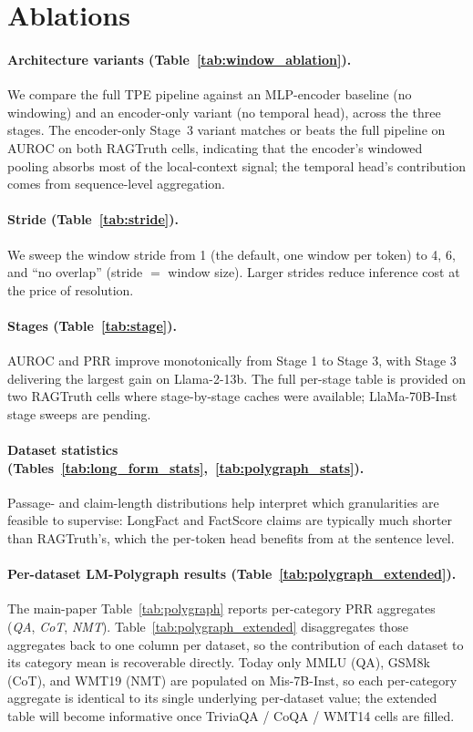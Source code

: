 \section{Ablations}
\label{sec:ablations}

\paragraph{Architecture variants (Table~\ref{tab:window_ablation}).}
We compare the full TPE pipeline against an MLP-encoder baseline
(no windowing) and an encoder-only variant (no temporal head), across
the three stages. The encoder-only Stage~3 variant matches or beats
the full pipeline on AUROC on both RAGTruth cells, indicating that
the encoder's windowed pooling absorbs most of the local-context
signal; the temporal head's contribution comes from sequence-level
aggregation.

\paragraph{Stride (Table~\ref{tab:stride}).} We sweep the window
stride from 1 (the default, one window per token) to 4, 6, and
``no overlap'' (stride $=$ window size). Larger strides reduce
inference cost at the price of resolution.

\paragraph{Stages (Table~\ref{tab:stage}).} AUROC and PRR improve
monotonically from Stage 1 to Stage 3, with Stage 3 delivering the
largest gain on Llama-2-13b. The full per-stage table is provided on
two RAGTruth cells where stage-by-stage caches were available;
LlaMa-70B-Inst stage sweeps are pending.

\paragraph{Dataset statistics
(Tables~\ref{tab:long_form_stats},~\ref{tab:polygraph_stats}).}
Passage- and claim-length distributions help interpret which
granularities are feasible to supervise: LongFact and FactScore claims
are typically much shorter than RAGTruth's, which the per-token head
benefits from at the sentence level.

\paragraph{Per-dataset LM-Polygraph results (Table~\ref{tab:polygraph_extended}).}
The main-paper Table~\ref{tab:polygraph} reports per-category PRR
aggregates (\emph{QA}, \emph{CoT}, \emph{NMT}).
Table~\ref{tab:polygraph_extended} disaggregates those aggregates back
to one column per dataset, so the contribution of each dataset to its
category mean is recoverable directly. Today only MMLU (QA), GSM8k
(CoT), and WMT19 (NMT) are populated on Mis-7B-Inst, so each
per-category aggregate is identical to its single underlying
per-dataset value; the extended table will become informative once
TriviaQA / CoQA / WMT14 cells are filled.

